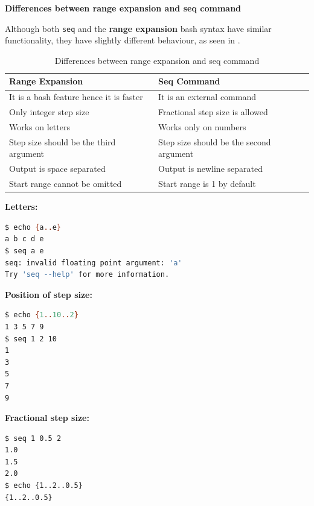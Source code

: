 \textbf{Differences between range expansion and seq command}

Although both \lstinline|seq| and the \textbf{range expansion} bash syntax have similar functionality, they have slightly different behaviour, as seen in .

\begin{table}[h!]
  \caption{Differences between range expansion and seq command}
  \begin{tabularx}{\linewidth}{>{\raggedright\arraybackslash}X >{\raggedright\arraybackslash}X}
    \toprule
    \textbf{Range Expansion} & \textbf{Seq Command} \\
    \midrule
    It is a bash feature hence it is faster & It is an external command \\
    Only integer step size & Fractional step size is allowed \\
    Works on letters & Works only on numbers \\
    Step size should be the third argument & Step size should be the second argument \\
    Output is space separated & Output is newline separated \\
    Start range cannot be omitted & Start range is 1 by default \\
    \bottomrule
  \end{tabularx}
\end{table}

\textbf{Letters:}

\begin{lstlisting}[language=bash]
$ echo {a..e}
a b c d e
$ seq a e
seq: invalid floating point argument: 'a'
Try 'seq --help' for more information.
\end{lstlisting}

\textbf{Position of step size:}

\begin{lstlisting}[language=bash]
$ echo {1..10..2}
1 3 5 7 9
$ seq 1 2 10
1
3
5
7
9
\end{lstlisting}

\textbf{Fractional step size:}

\begin{lstlisting}[language=bash]
$ seq 1 0.5 2
1.0
1.5
2.0
$ echo {1..2..0.5}
{1..2..0.5}
\end{lstlisting}

